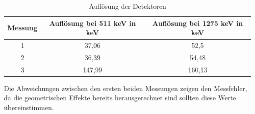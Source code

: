 \documentclass[a4paper,14pt,twoside]{article}
\begin{document}
\begin{table}
\begin{center}
    \caption{Auflösung der Detektoren}
    \label{l3}
    \begin{tabular}[c]{|c|c|c|}
    \hline
    Messung & Auflösung bei 511 keV in keV&Auflösung bei 1275 keV in keV \\
	\hline 
     1 & 37,06 & 52,5\\\hline
     2 & 36,39 & 54,48\\\hline
     3 & 147,99 & 160,13\\\hline
     
    
    \hline
    \end{tabular}
\end{center}
\end{table}
 Die Abweichungen zwischen den ersten beiden Messungen zeigen den Messfehler, da die geometrischen Effekte bereits herausgerechnet sind sollten diese Werte übereinstimmen.
\end{document}

